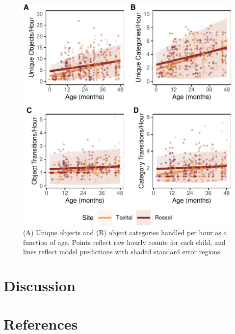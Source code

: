 \documentclass[10pt, letterpaper]{article}
\newenvironment{CodeChunk}{}{}
\begin{document}
\begin{CodeChunk}
\begin{figure}[!ht]

{\centering \includegraphics{figs/age-effects-fig-1} 

}

\caption[(A) Unique objects and (B) object categories handled per hour as a function of age]{(A) Unique objects and (B) object categories handled per hour as a function of age. Points reflect raw hourly counts for each child, and lines reflect model predictions with shaded standard error regions.}\label{fig:age-effects-fig}
\end{figure}
\end{CodeChunk}

\hypertarget{discussion}{%
\section{Discussion}\label{discussion}}

\hypertarget{references}{%
\section{References}\label{references}}

\setlength{\parindent}{-0.1in} 
\setlength{\leftskip}{0.125in}
\end{document}
